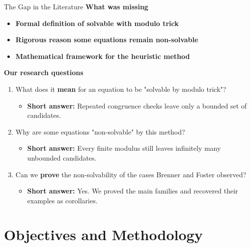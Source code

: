 ﻿\documentclass[10pt,aspectratio=169]{beamer}
\begin{document}
\begin{frame}{The Gap in the Literature}
    \textbf{What was missing}
    \begin{itemize}
        \item \textbf{Formal definition of solvable with modulo trick}
        \item \textbf{Rigorous reason some equations remain non-solvable}
        \item \textbf{Mathematical framework for the heuristic method}
    \end{itemize}

    \vspace{0.15cm}
    \textbf{Our research questions}
    \begin{enumerate}
        \item What does it \textbf{mean} for an equation to be "solvable by modulo trick"?
        \begin{itemize}
            \item \textbf{Short answer:} Repeated congruence checks leave only a bounded set of candidates.
        \end{itemize}
        \item Why are some equations "non-solvable" by this method?
        \begin{itemize}
            \item \textbf{Short answer:} Every finite modulus still leaves infinitely many unbounded candidates.
        \end{itemize}
        \item Can we \textbf{prove} the non-solvability of the cases Brenner and Foster observed?
        \begin{itemize}
            \item \textbf{Short answer:} Yes. We proved the main families and recovered their examples as corollaries.
        \end{itemize}
    \end{enumerate}
\end{frame}

\section{Objectives and Methodology}
\end{document}
